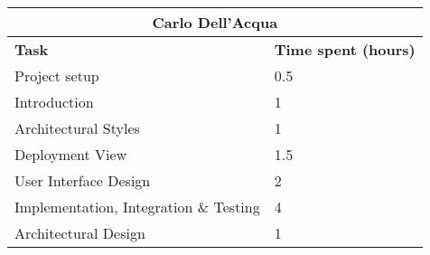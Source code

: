 \begin{table}[h]
  \centering
  \begin{tabular}{l|l}
    \multicolumn{2}{c}{\textbf{Carlo Dell'Acqua}} \\
    \hline
    \textbf{Task} & \textbf{Time spent (hours)}\\
    \hline
    Project setup & 0.5 \\
    Introduction & 1 \\
    Architectural Styles & 1 \\
    Deployment View & 1.5 \\
    User Interface Design & 2 \\
    Implementation, Integration \& Testing & 4 \\
    Architectural Design & 1 \\
  \end{tabular}
\end{table}
